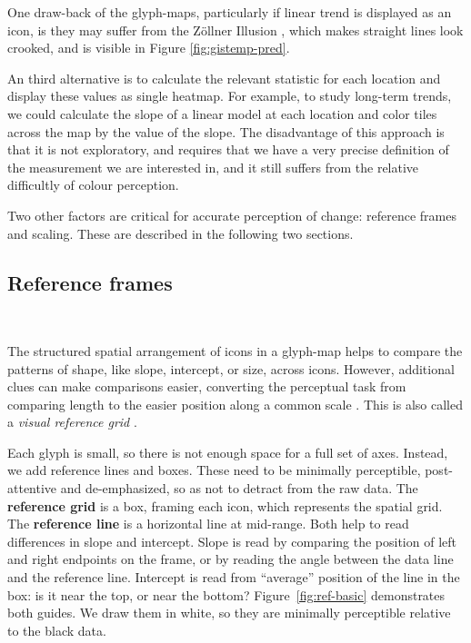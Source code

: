 \documentclass[oneside]{article}
\begin{document}
One draw-back of the glyph-maps, particularly if linear trend is displayed as an icon, is they may suffer from the Z\"ollner Illusion \citep{Zollner}, which makes straight lines look crooked, and is visible in Figure \ref{fig:gistemp-pred}.

An third alternative is to calculate the relevant statistic for each location and display these values as single heatmap. For example, to study long-term trends, we could calculate the slope of a linear model at each location and color tiles across the map by the value of the slope. The disadvantage of this approach is that it is not exploratory, and requires that we have a very precise definition of the measurement we are interested in, and it still suffers from the relative difficultly of colour perception.

Two other factors are critical for accurate perception of change: reference frames and scaling. These are described in the following two sections.

\subsection{Reference frames}~\label{sec:reference}

The structured spatial arrangement of icons in a glyph-map helps to compare the patterns of shape, like slope, intercept, or size, across icons. However, additional clues can make comparisons easier, converting the perceptual task from comparing length to the easier position along a common scale \citep{cleveland:1984}. This is also called a \emph{visual reference grid} \citep{cleveland:1993a}.

Each glyph is small, so there is not enough space for a full set of axes. Instead, we add reference lines and boxes. These need to be minimally perceptible, post-attentive \citep{healey} and de-emphasized, so as not to detract from the raw data. The \textbf{reference grid} is a box, framing each icon, which represents the spatial grid. The \textbf{reference line} is a horizontal line at mid-range. Both help to read differences in slope and intercept. Slope is read by comparing the position of left and right endpoints on the frame, or by reading the angle between the data line and the reference line. Intercept is read from ``average'' position of the line in the box: is it near the top, or near the bottom? Figure~\ref{fig:ref-basic} demonstrates both guides. We draw them in white, so they are minimally perceptible relative to the black data.
\end{document}

